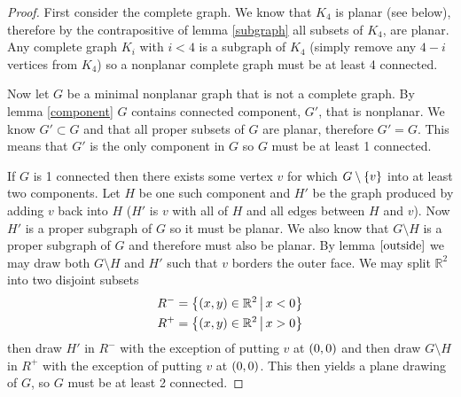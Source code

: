 \documentclass{article}
\begin{document}
\begin{proof}
	First consider the complete graph. We know that $K_4$ is planar (see below), therefore by the contrapositive of lemma \ref{subgraph} all subsets of $K_4$, are planar. Any complete graph $K_i$ with $i < 4$ is a subgraph of $K_4$ (simply remove any $4-i$ vertices from $K_4$) so a nonplanar complete graph must be at least 4 connected.
	
	\begin{center}
	\end{center}
	
	
	Now let $G$ be a minimal nonplanar graph that is not a complete graph. By lemma \ref{component} $G$ contains connected component, $G'$, that is nonplanar. We know $G'\subset G$ and that all proper subsets of $G$ are planar, therefore $G'=G$. This means that $G'$ is the only component in $G$ so $G$ must be at least 1 connected.
	
	If $G$ is 1 connected then there exists some vertex $v$ for which $G\setminus\left\{ {v} \right\}$ into at least two components. Let $H$ be one such component and $H'$ be the graph produced by adding $v$ back into $H$ ($H'$ is $v$ with all of $H$ and all edges between $H$ and $v$). Now $H'$ is a proper subgraph of $G$ so it must be planar. We also know that $G\setminus H$ is a proper subgraph of $G$ and therefore must also be planar. By lemma $\ref{outside}$ we may draw both $G\setminus H$ and $H'$ such that $v$ borders the outer face. We may split $\mathbb R^2$ into two disjoint subsets
	\begin{align*}
	R^- &= \left\{{\left( {x} , {y} \right)\in\mathbb R^2} \,\middle|\, {x < 0}\right\}\\
	R^+&=\left\{{\left( {x} , {y} \right)\in\mathbb R^2} \,\middle|\, {x > 0}\right\}
	\end{align*}	
	then draw $H'$ in $R^-$ with the exception of putting $v$ at $\left( {0} , {0} \right)$ and then draw $G\setminus H$ in $R^+$ with the exception of putting $v$ at $\left( {0} , {0} \right)$. This then yields a plane drawing of $G$, so $G$ must be at least 2 connected.
\end{proof}
\end{document}
